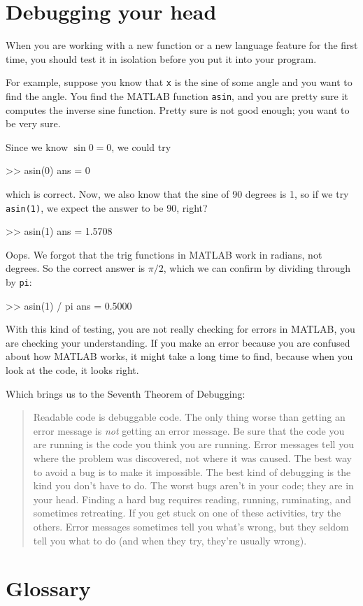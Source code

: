 \documentclass[
]{book}
\numberwithin{Answer}{chapter}
\numberwithin{Exercise}{chapter}
\newcommand{\displaythrm}[1]{%
    \ifthenelse{\equal{#1}{1}}%
        {Readable code is debuggable code.}{%
    \ifthenelse{\equal{#1}{2}}%
        {The only thing worse than getting an error message is {\em
         not} getting an error message.}{%
    \ifthenelse{\equal{#1}{3}}%
        {Be sure that the code you are running
         is the code you think you are running.}{%
    \ifthenelse{\equal{#1}{4}}%
        {Error messages tell you where the problem was discovered,
         not where it was caused.}{%
    \ifthenelse{\equal{#1}{5}}%
        {The best way to avoid a bug is to make it impossible.}{%
    \ifthenelse{\equal{#1}{6}}%
        {The best kind of debugging is the kind you don't have to do.}{%
    \ifthenelse{\equal{#1}{7}}%
        {The worst bugs aren't in your code; they are in your head.}{%
    \ifthenelse{\equal{#1}{8}}%
        {Finding a hard bug requires reading, running, ruminating,
         and sometimes retreating.  If you get stuck on one of these
         activities, try the others.}{%
    \ifthenelse{\equal{#1}{9}}%
        {Error messages sometimes tell you what's wrong, but they
         seldom tell you what to do (and when they try, they're usually
         wrong).}{%
    {}%
}}}}}}}}}}%
\begin{document}
\section{Debugging your head}

When you are working with a new function or a new language feature
for the first time, you should test it in isolation before you
put it into your program.

For example, suppose you know that {\tt x} is the sine of some
angle and you want to find the angle.  You find the MATLAB function
{\tt asin}, and you are pretty sure it computes the inverse sine
function.  Pretty sure is not good enough; you want to be very sure.

Since we know $\sin 0 = 0$, we could try

\begin{code}
>> asin(0)
ans = 0
\end{code}

which is correct.  Now, we also know that the sine of 90 degrees is
1, so if we try {\tt asin(1)}, we expect the answer to be 90, right?

\begin{code}
>> asin(1)
ans = 1.5708
\end{code}

Oops.  We forgot that the trig functions in MATLAB work in radians,
not degrees.  So the correct answer is $\pi/2$, which we can
confirm by dividing through by {\tt pi}:

\begin{code}
>> asin(1) / pi
ans = 0.5000
\end{code}

With this kind of testing, you are not really checking for
errors in MATLAB, you are checking your understanding.  If you
make an error because you are confused about how MATLAB works, it
might take a long time to find, because when you look at the code,
it looks right.


Which brings us to the Seventh Theorem of Debugging:

\begin{quote}
\displaythrm{6}
\end{quote}


\section{Glossary}
\end{document}
